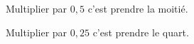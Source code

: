 Multiplier par $0,5$ c'est prendre la moitié.\par\noindent
Multiplier par $0,25$ c'est prendre le quart.